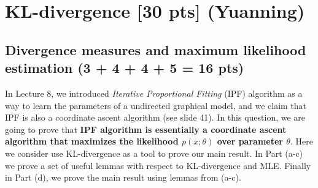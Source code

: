 
\section{KL-divergence [30 pts] (Yuanning)}
\subsection{Divergence measures and maximum likelihood estimation (3 + 4 + 4 + 5 = 16 pts)} 
In Lecture 8, we introduced \textit{Iterative Proportional Fitting} (IPF) algorithm as a way to learn the parameters of a undirected graphical model, and we claim that IPF is also a coordinate ascent algorithm (see slide 41). In this question, we are going to prove that \textbf{IPF algorithm is essentially a coordinate ascent algorithm that maximizes the likelihood $p(x; \theta)$ over parameter $\theta$}. Here we consider use KL-divergence as a tool to prove our main result. In Part (a-c) we prove a set of useful lemmas with respect to KL-divergence and MLE. Finally in Part (d), we prove the main result using lemmas from (a-c).


